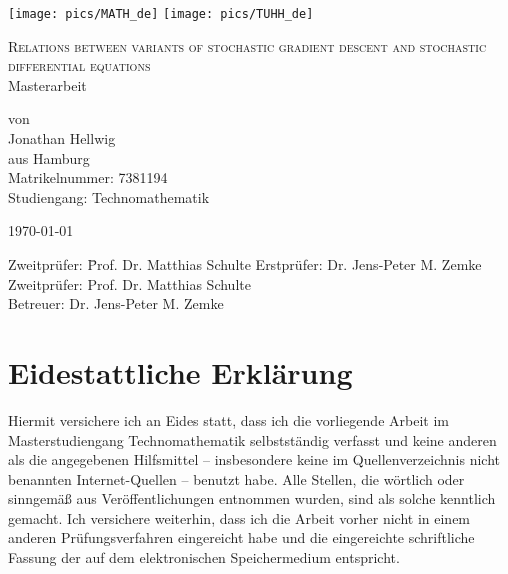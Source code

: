 \documentclass[12pt]{article}
\theoremstyle{definition}
\numberwithin{equation}{section}
\begin{document}
\thispagestyle{empty}

\begin{center}
  \texttt{[image: pics/MATH\_de]}
  \hfill
  \texttt{[image: pics/TUHH\_de]}
\end{center}

\vspace*{5em}

\begin{center}
  {\Huge
    \textsc{Relations between variants of stochastic gradient descent and stochastic differential equations}\\[2em]
  }
  {\LARGE
    Masterarbeit
  }

  \vspace*{2em}

  {\Large
    von\\
    Jonathan Hellwig\\
    aus Hamburg\\
    Matrikelnummer: 7381194\\
    Studiengang: Technomathematik\\
  }
\end{center}

\vfill
\begin{center}
  \today
\end{center}
\vfill

\begin{tabbing}
  Zweitprüfer:  \= Prof. Dr. Matthias Schulte\kill
  Erstprüfer: \> Dr. Jens-Peter M. Zemke\\
  Zweitprüfer:  \> Prof. Dr. Matthias Schulte\\
  Betreuer:     \> Dr. Jens-Peter M. Zemke\\
\end{tabbing}
\newpage
\thispagestyle{empty}
\mbox{}
\newpage

\section*{Eidestattliche Erklärung}

Hiermit versichere ich an Eides statt, dass ich die vorliegende Arbeit im Masterstudiengang Technomathematik selbstständig verfasst und keine anderen als die angegebenen Hilfsmittel – insbesondere keine im Quellenverzeichnis nicht benannten Internet-Quellen – benutzt habe. Alle Stellen, die wörtlich oder sinngemäß aus Veröffentlichungen entnommen wurden, sind als solche kenntlich gemacht. Ich versichere weiterhin, dass ich die Arbeit vorher nicht in einem anderen Prüfungsverfahren eingereicht habe und die eingereichte schriftliche Fassung der auf dem elektronischen Speichermedium entspricht.
\end{document}
